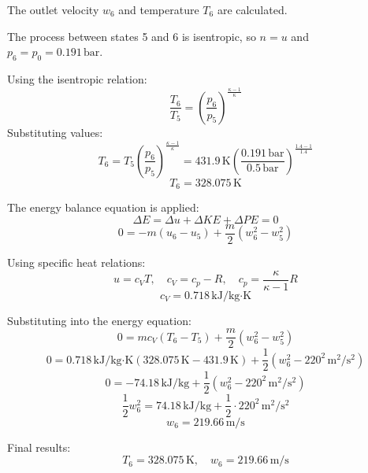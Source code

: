 The outlet velocity \( w_6 \) and temperature \( T_6 \) are calculated.  

The process between states 5 and 6 is isentropic, so \( n = u \) and \( p_6 = p_0 = 0.191 \, \text{bar} \).  

Using the isentropic relation:  
\[
\frac{T_6}{T_5} = \left( \frac{p_6}{p_5} \right)^{\frac{\kappa - 1}{\kappa}}
\]  
Substituting values:  
\[
T_6 = T_5 \left( \frac{p_6}{p_5} \right)^{\frac{\kappa - 1}{\kappa}} = 431.9 \, \text{K} \left( \frac{0.191 \, \text{bar}}{0.5 \, \text{bar}} \right)^{\frac{1.4 - 1}{1.4}}
\]  
\[
T_6 = 328.075 \, \text{K}
\]  

The energy balance equation is applied:  
\[
\Delta E = \Delta u + \Delta KE + \Delta PE = 0
\]  
\[
0 = -m \left( u_6 - u_5 \right) + \frac{m}{2} \left( w_6^2 - w_5^2 \right)
\]  

Using specific heat relations:  
\[
u = c_V T, \quad c_V = c_p - R, \quad c_p = \frac{\kappa}{\kappa - 1} R
\]  
\[
c_V = 0.718 \, \text{kJ}/\text{kg·K}
\]  

Substituting into the energy equation:  
\[
0 = m c_V \left( T_6 - T_5 \right) + \frac{m}{2} \left( w_6^2 - w_5^2 \right)
\]  
\[
0 = 0.718 \, \text{kJ}/\text{kg·K} \left( 328.075 \, \text{K} - 431.9 \, \text{K} \right) + \frac{1}{2} \left( w_6^2 - 220^2 \, \text{m}^2/\text{s}^2 \right)
\]  
\[
0 = -74.18 \, \text{kJ}/\text{kg} + \frac{1}{2} \left( w_6^2 - 220^2 \, \text{m}^2/\text{s}^2 \right)
\]  
\[
\frac{1}{2} w_6^2 = 74.18 \, \text{kJ}/\text{kg} + \frac{1}{2} \cdot 220^2 \, \text{m}^2/\text{s}^2
\]  
\[
w_6 = 219.66 \, \text{m/s}
\]  

Final results:  
\[
T_6 = 328.075 \, \text{K}, \quad w_6 = 219.66 \, \text{m/s}
\]
